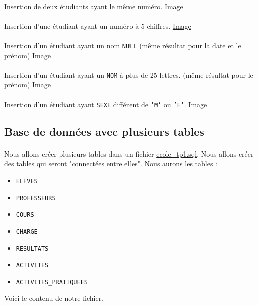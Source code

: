 \documentclass{report}
\begin{document}
\paragraph{}Insertion de deux étudiants ayant le même numéro. \href{run:./Images/TP1/contrainte2.png}{Image}

\paragraph{}Insertion d'une étudiant ayant un numéro à 5 chiffres. \href{run:./Images/TP1/contrainte3.png}{Image}

\paragraph{}Insertion d'un étudiant ayant un nom {\tt NULL} (même résultat pour la date et le prénom) \href{run:./Images/TP1/contrainte4.png}{Image}

\paragraph{}Insertion d'un étudiant ayant un {\tt NOM} à plus de 25 lettres. (même résultat pour le prénom) \href{run:./Images/TP1/contrainte5.png}{Image}

\paragraph{}Insertion d'un étudiant ayant {\tt SEXE} différent de {\tt 'M'} ou {\tt 'F'}. \href{run:./Images/TP1/contrainte6.png}{Image}

\subsection{Base de données avec plusieurs tables}

\paragraph{}Nous allons créer plusieurs tables dans un fichier \href{./TP1/ecole_tp1.sql}{ecole\_tp1.sql}. Nous allons créer des tables qui seront "connectées entre elles". Nous aurons les tables :
\begin{itemize}
	\item {\tt ELEVES}
	\item {\tt PROFESSEURS}
	\item {\tt COURS}
	\item {\tt CHARGE}
	\item {\tt RESULTATS}
	\item {\tt ACTIVITES}
	\item {\tt ACTIVITES\_PRATIQUEES}
\end{itemize}
Voici le contenu de notre fichier.
\end{document}
